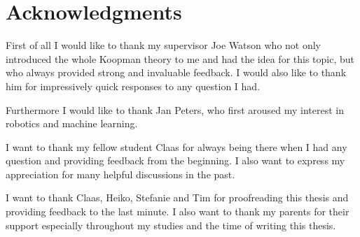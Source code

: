 \chapter*{Acknowledgments}



First of all I would like to thank my supervisor Joe Watson who not only introduced the whole Koopman theory to me and had the idea for this topic, but who always provided strong and invaluable feedback. I would also like to thank him for impressively quick responses to any question I had.

Furthermore I would like to thank Jan Peters, who first aroused my interest in robotics and machine learning.

I want to thank my fellow student Claas for always being there when I had any question and providing feedback from the beginning. I also want to express my appreciation for many helpful discussions in the past.

I want to thank Claas, Heiko, Stefanie and Tim for proofreading this thesis and providing feedback to the last minute. I also want to thank my parents for their support especially throughout my studies and the time of writing this thesis.
